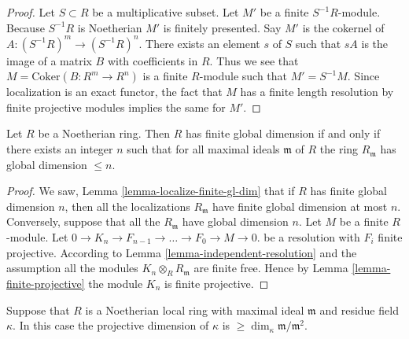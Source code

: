 \begin{proof}
Let $S \subset R$ be a multiplicative subset.
Let $M'$ be a finite $S^{-1}R$-module. 
Because $S^{-1}R$ is Noetherian $M'$ is finitely presented.
Say $M'$ is the cokernel of $A : (S^{-1}R)^m
\to (S^{-1}R)^n$. There exists an element $s$ of $S$ such
that $sA$ is the image of a matrix $B$ with coefficients in $R$.
Thus we see that $M = \text{Coker}(B : R^m \to R^n)$
is a finite $R$-module such that $M' = S^{-1}M$.
Since localization is an exact functor, the fact that
$M$ has a finite length resolution by finite projective
modules implies the same for $M'$.
\end{proof}

\begin{lemma}
\label{lemma-finite-gl-dim-primes}
Let $R$ be a Noetherian ring.
Then $R$ has finite global dimension if and
only if there exists an integer $n$ such that
for all maximal ideals $\mathfrak m$ of $R$
the ring $R_{\mathfrak m}$ has global dimension
$\leq n$.
\end{lemma}

\begin{proof}
We saw, Lemma \ref{lemma-localize-finite-gl-dim}
that if $R$ has finite global dimension $n$,
then all the localizations $R_{\mathfrak m}$
have finite global dimension at most $n$.
Conversely, suppose that all the $R_{\mathfrak m}$
have global dimension $n$. Let $M$ be a finite
$R$-module. Let
$0 \to K_n \to F_{n-1} \to \ldots \to F_0 \to M\to 0$.
be a resolution with $F_i$ finite projective.
According to Lemma \ref{lemma-independent-resolution}
and the assumption all the modules $K_n \otimes_R R_{\mathfrak m}$
are finite free. Hence by Lemma \ref{lemma-finite-projective}
the module $K_n$ is finite projective.
\end{proof}

\begin{lemma}
\label{lemma-length-resolution-residue-field}
Suppose that $R$ is a Noetherian local ring
with maximal ideal $\mathfrak m$ and
residue field $\kappa$. In this case
the projective dimension of $\kappa$ is
$\geq \dim_\kappa \mathfrak m / \mathfrak m^2$.
\end{lemma}

